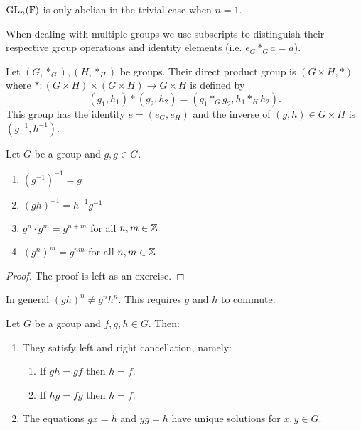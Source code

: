\documentclass[11pt]{article}
\begin{document}
\begin{note}
    $\operatorname{GL}_n(\mathbb{F})$ is only abelian in the trivial case when $n=1$.
\end{note}

\begin{notation}
    When dealing with multiple groups we use subscripts to distinguish their respective group operations and identity elements (i.e. $e_G*_Ga=a$).
\end{notation}

\begin{definition}
    Let $(G,*_G),(H,*_H)$ be groups. Their direct product group is $(G\times H,*)$ where $*:(G\times H)\times(G\times H)\to G\times H$ is defined by
    \[(g_1,h_1)*(g_2,h_2)=(g_1*_Gg_2,h_1*_Hh_2).\]
    This group has the identity $e=(e_G,e_H)$ and the inverse of $(g,h)\in G\times H$ is $(g^{-1},h^{-1})$.
\end{definition}

\begin{proposition}
    Let $G$ be a group and $g,g\in G$.
    \begin{enumerate}
        \item $(g^{-1})^{-1}=g$
        \item $(gh)^{-1}=h^{-1}g^{-1}$
        \item $g^n\cdot g^m=g^{n+m}$ for all $n,m\in\mathbb{Z}$
        \item $(g^n)^m=g^{nm}$ for all $n,m\in\mathbb{Z}$
    \end{enumerate}
\end{proposition}

\begin{proof}
    The proof is left as an exercise.
\end{proof}

\begin{note}
    In general $(gh)^n\neq g^nh^n$. This requires $g$ and $h$ to commute.
\end{note}

\begin{proposition}
    Let $G$ be a group and $f,g,h\in G$. Then:
    \begin{enumerate}
        \item They satisfy left and right cancellation, namely:
        \begin{enumerate}
            \item If $gh=gf$ then $h=f$.
            \item If $hg=fg$ then $h=f$.
        \end{enumerate}
        \item The equations $gx=h$ and $yg=h$ have unique solutions for $x,y\in G$.
    \end{enumerate}
\end{proposition}
\end{document}

